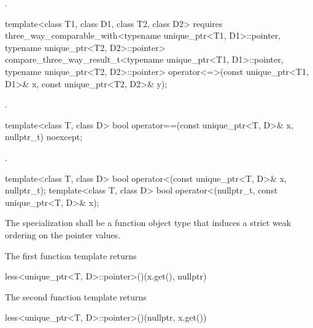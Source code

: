 \begin{itemdescr}
\pnum
\returns
{}.
\end{itemdescr}

%
\begin{itemdecl}
template<class T1, class D1, class T2, class D2>
  requires three_way_comparable_with<typename unique_ptr<T1, D1>::pointer,
                                     typename unique_ptr<T2, D2>::pointer>
  compare_three_way_result_t<typename unique_ptr<T1, D1>::pointer,
                             typename unique_ptr<T2, D2>::pointer>
    operator<=>(const unique_ptr<T1, D1>& x, const unique_ptr<T2, D2>& y);
\end{itemdecl}

\begin{itemdescr}
\pnum
\returns
{}.
\end{itemdescr}

%
\begin{itemdecl}
template<class T, class D>
  bool operator==(const unique_ptr<T, D>& x, nullptr_t) noexcept;
\end{itemdecl}

\begin{itemdescr}
\pnum
\returns
{}.
\end{itemdescr}

%
\begin{itemdecl}
template<class T, class D>
  bool operator<(const unique_ptr<T, D>& x, nullptr_t);
template<class T, class D>
  bool operator<(nullptr_t, const unique_ptr<T, D>& x);
\end{itemdecl}

\begin{itemdescr}
\pnum
\requires The specialization  shall be
a function object type that induces a strict weak
ordering on the pointer values.

\pnum
\returns
The first function template returns
\begin{codeblock}
less<unique_ptr<T, D>::pointer>()(x.get(), nullptr)
\end{codeblock}
The second function template returns
\begin{codeblock}
less<unique_ptr<T, D>::pointer>()(nullptr, x.get())
\end{codeblock}
\end{itemdescr}

